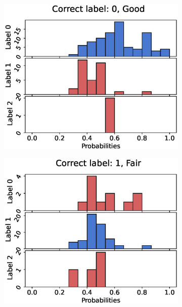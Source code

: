 \begin{figure}
  \centering
  \begin{subfigure}[t]{0.33\textwidth}
    \includegraphics[width=\textwidth]{files/figs/res/trunk/pc0-rb.eps}
    \caption{}
    \label{fig:trunk-pc0}
  \end{subfigure}%
  \begin{subfigure}[t]{0.33\textwidth}
    \includegraphics[width=\textwidth]{files/figs/res/trunk/pc1-rb.eps}
    \caption{}
    \label{fig:trunk-pc1}
  \end{subfigure}%

\end{figure}
